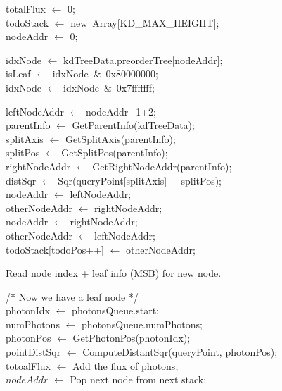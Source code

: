 \begin{algorithm}
	\SetAlgoLined

	totalFlux \(\leftarrow\) 0; \\
	todoStack \(\leftarrow\) new\ Array[KD\_MAX\_HEIGHT]; \\
	nodeAddr \(\leftarrow\) 0; \\

	 {

		idxNode \(\leftarrow\) kdTreeData.preorderTree[nodeAddr]; \\
		isLeaf \(\leftarrow\) idxNode\ \&\ 0x80000000; \\
		idxNode \(\leftarrow\) idxNode\ \&\ 0x7fffffff; \\
		
		 {
			leftNodeAddr \(\leftarrow\) nodeAddr+1+2; \\
		
			parentInfo \(\leftarrow\) GetParentInfo(kdTreeData); \\
			splitAxis \(\leftarrow\) GetSplitAxis(parentInfo); \\
			splitPos \(\leftarrow\) GetSplitPos(parentInfo); \\
			rightNodeAddr \(\leftarrow\) GetRightNodeAddr(parentInfo); \\
		
			distSqr \(\leftarrow\) Sqr(queryPoint[splitAxis] \(-\) splitPos); \\
			
			nodeAddr \(\leftarrow\) leftNodeAddr; \\
			otherNodeAddr \(\leftarrow\) rightNodeAddr; \\
			 {
				nodeAddr \(\leftarrow\) rightNodeAddr; \\
				otherNodeAddr \(\leftarrow\) leftNodeAddr; \\
			}
			 {
				todoStack[todoPos++] \(\leftarrow\) otherNodeAddr; \\
			}
			
			Read node index + leaf info (MSB) for new node. \\
		}
		
		/* Now we have a leaf node */ \\
		photonIdx \(\leftarrow\) photonsQueue.start; \\
		numPhotons \(\leftarrow\) photonsQueue.numPhotons; \\
		 {
			photonPos \(\leftarrow\) GetPhotonPos(photonIdx); \\
			pointDistSqr \(\leftarrow\) ComputeDistantSqr(queryPoint, photonPos); \\
			 {
				totoalFlux \(\leftarrow\) Add the flux of photons; \\
			}
		}
		\(nodeAddr\) \(\leftarrow\) Pop next node from next stack; \\	
	}	
	

\end{algorithm}
